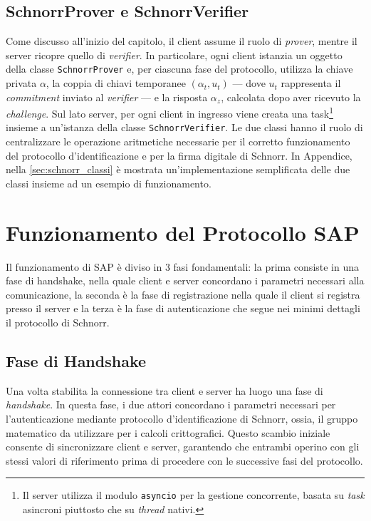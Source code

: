 \subsection{SchnorrProver e SchnorrVerifier}\label{sec:class_schnorr}

Come discusso all'inizio del capitolo, il client assume il ruolo di \textit{prover}, mentre il server ricopre quello di \textit{verifier}. In particolare, ogni client istanzia un oggetto della classe \texttt{SchnorrProver} e, per ciascuna fase del protocollo, utilizza la chiave privata $\alpha$, la coppia di chiavi temporanee $(\alpha_t, u_t)$ — dove $u_t$ rappresenta il \textit{commitment} inviato al \textit{verifier} — e la risposta $\alpha_z$, calcolata dopo aver ricevuto la \textit{challenge}. Sul lato server, per ogni client in ingresso viene creata una task\footnote{Il server utilizza il modulo \texttt{asyncio} per la gestione concorrente, basata su \textit{task} asincroni piuttosto che su \textit{thread} nativi.} insieme a un'istanza della classe \texttt{SchnorrVerifier}. Le due classi hanno il ruolo di centralizzare le operazione aritmetiche necessarie per il corretto funzionamento del protocollo d'identificazione e per la firma digitale di Schnorr. In Appendice, nella \autoref{sec:schnorr_classi} è mostrata un'implementazione semplificata delle due classi insieme ad un esempio di funzionamento.

\section{Funzionamento del Protocollo SAP}\label{sec:sap}

Il funzionamento di SAP è diviso in 3 fasi fondamentali: la prima consiste in una fase di handshake, nella quale client e server concordano i parametri necessari alla comunicazione, la seconda è la fase di registrazione nella quale il client si registra presso il server e la terza è la fase di autenticazione che segue nei minimi dettagli il protocollo di Schnorr. 


\subsection{Fase di Handshake}
Una volta stabilita la connessione tra client e server ha luogo una fase di \textit{handshake}. In questa fase, i due attori concordano i parametri necessari per l'autenticazione mediante protocollo d'identificazione di Schnorr, ossia, il gruppo matematico da utilizzare per i calcoli crittografici. Questo scambio iniziale consente di sincronizzare client e server, garantendo che entrambi operino con gli stessi valori di riferimento prima di procedere con le successive fasi del protocollo.

